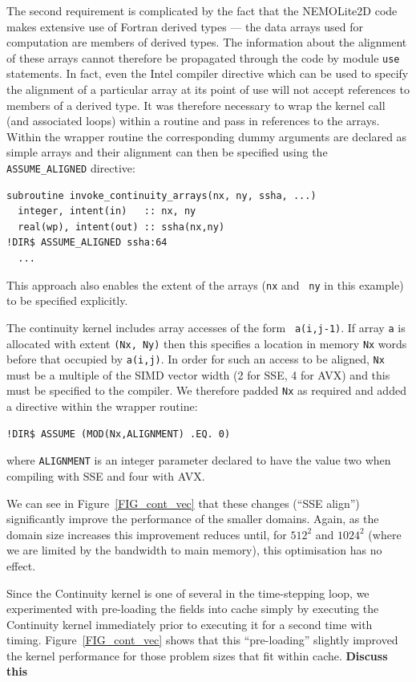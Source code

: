 \documentclass[12pt]{article}
\begin{document}
The second requirement is complicated by the fact that the NEMOLite2D
code makes extensive use of Fortran derived types --- the data arrays
used for computation are members of derived types. The information
about the alignment of these arrays cannot therefore be propagated
through the code by module {\tt use} statements. In fact, even the
Intel compiler directive which can be used to specify the alignment
of a particular array at its point of use will not accept references
to members of a derived type. It was therefore necessary to wrap the
kernel call (and associated loops) within a routine and pass in
references to the arrays. Within the wrapper routine the corresponding
dummy arguments are declared as simple arrays and their alignment can
then be specified using the {\tt ASSUME\_ALIGNED} directive:
\begin{verbatim}
subroutine invoke_continuity_arrays(nx, ny, ssha, ...)
  integer, intent(in)   :: nx, ny
  real(wp), intent(out) :: ssha(nx,ny)
!DIR$ ASSUME_ALIGNED ssha:64
  ...
\end{verbatim}
This approach also enables the extent of the arrays ({\tt nx} and {\tt
  ny} in this example) to be specified explicitly.

The continuity kernel includes array accesses of the form {\tt
  a(i,j-1)}. If array {\tt a} is allocated with extent {\tt (Nx, Ny)}
then this specifies a location in memory {\tt Nx} words before that
occupied by {\tt a(i,j)}. In order for such an access to be aligned,
{\tt Nx} must be a multiple of the SIMD vector width (2 for SSE, 4 for
AVX) and this must be specified to the compiler. We therefore padded {\tt Nx}
as required and added a directive within the wrapper routine:
\begin{verbatim}
!DIR$ ASSUME (MOD(Nx,ALIGNMENT) .EQ. 0)
\end{verbatim}
where {\tt ALIGNMENT} is an integer parameter declared to have the value two
when compiling with SSE and four with AVX.

We can see in Figure~\ref{FIG_cont_vec} that these changes (``SSE
align'') significantly improve the performance of the smaller
domains. Again, as the domain size increases this improvement reduces
until, for $512^2$ and $1024^2$ (where we are limited by the bandwidth
to main memory), this optimisation has no effect.

Since the Continuity kernel is one of several in the time-stepping
loop, we experimented with pre-loading the fields into cache simply by
executing the Continuity kernel immediately prior to executing it for
a second time with timing. Figure~\ref{FIG_cont_vec} shows that this
``pre-loading'' slightly improved the kernel performance for those
problem sizes that fit within cache. {\bf Discuss this}
\end{document}
